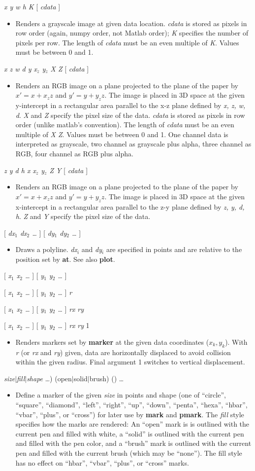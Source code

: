 \documentclass[11pt]{article}
\def\cmd#1#2{\noindent {\bf #1} #2\par}
\def\expl#1{\kern-8pt\begin{itemize}\item[]#1\end{itemize}}
\def\cref#1{{\bf #1}}
\def\bar{{$|$}}
\begin{document}
\cmd{imageg}{\emph{x y w h K} [ \emph{cdata} ]}
\expl{Renders a grayscale image at given data location. \emph{cdata} is
  stored as pixels in row order (again, numpy order, not Matlab order); 
   \emph{K} specifies
  the number of pixels per row. The length of \emph{cdata} must be an
  even multiple of \emph{K}. Values must be between 0 and 1.}

\cmd{xzimage}{\emph{x z w d y x$_z$ y$_z$ X Z} [ \emph{cdata} ]}
\expl{Renders an RGB image on a plane projected to the plane of
  the paper by $x' = x + x_z z$ and $y' = y + y_z z$. The image is
  placed in 3D space at the given y-intercept in a rectangular area
  parallel to the x-z plane defined by \emph{x, z, w, d}. \emph{X} and
  \emph{Z} specify the pixel size of the data. \emph{cdata} is stored
  as pixels in row order (unlike matlab's convention). The length of
  \emph{cdata} must be an even multiple of \emph{X Z}. Values must be
  between 0 and 1. One channel data is interpreted as grayscale, two
  channel as grayscale plus alpha, three channel as RGB, four channel
  as RGB plus alpha.}

\cmd{zyimage}{\emph{z y d h x x$_z$ y$_z$ Z Y} [ \emph{cdata} ]}
\expl{Renders an RGB image on a plane projected to the plane of
  the paper by $x' = x + x_z z$ and $y' = y + y_z z$. The image is
  placed in 3D space at the given x-intercept in a rectangular area
  parallel to the z-y plane defined by \emph{z, y, d, h}. \emph{Z} and
  \emph{Y} specify the pixel size of the data.} 


\cmd{line}{[ \emph{dx$_1$ dx$_2$ \ldots} ] [ \emph{dy$_1$ dy$_2$ \ldots} ]}
\expl{Draws a polyline. \emph{dx$_i$} and \emph{dy$_i$} are specified in
  points and are relative to the position set by \cref{at}. See also
  \cref{plot}.}

\cmd{mark}{[ \emph{x$_1$ x$_2$ \ldots} ] [ \emph{y$_1$ y$_2$ \ldots} ]}
\cmd{mark}{[ \emph{x$_1$ x$_2$ \ldots} ] [ \emph{y$_1$ y$_2$ \ldots} ]
\emph{r}}
\cmd{mark}{[ \emph{x$_1$ x$_2$ \ldots} ] [ \emph{y$_1$ y$_2$ \ldots} ]
\emph{rx} \emph{ry}}
\cmd{mark}{[ \emph{x$_1$ x$_2$ \ldots} ] [ \emph{y$_1$ y$_2$ \ldots} ]
\emph{rx} \emph{ry} 1}
\expl{Renders markers set by \cref{marker} at the given data
  coordinates ($x_k, y_k$). With \emph{r} (or \emph{rx} and \emph{ry})
  given, data are horizontally displaced to avoid collision within the
  given radius. Final argument 1 switches to vertical displacement.
}

\cmd{marker}{\emph{size}\bar\emph{fill}\bar\emph{shape} \ldots) (open\bar{}solid\bar{}brush)
  ()
  \ldots}
\expl{Define a marker of the given \emph{size} in points and shape
  (one of
  ``circle'', ``square'', ``diamond'', ``left'', ``right'', ``up'',
  ``down'', ``penta'', ``hexa'', ``hbar'', ``vbar'', ``plus'', or ``cross'')
  for
  later use by \cref{mark} and \cref{pmark}. The \emph{fill} style
  specifies how the marks are rendered: An ``open'' mark  is 
  is outlined with the current pen and filled with white,  a ``solid'' is
  outlined with the current pen and filled with the pen color, and a  ``brush'' mark is outlined  with
  the current pen and filled with the current brush (which may be ``none''). The fill style
  has no effect on ``hbar'', ``vbar'', ``plus'', or ``cross'' marks.}
\end{document}

